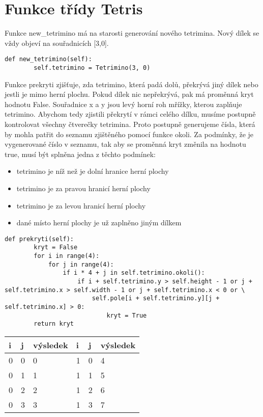 \documentclass[12pt]{report}			%
\begin{document}
			\section{Funkce třídy Tetris}
Funkce new\_tetrimino má na starosti generování nového tetrimina. Nový dílek se vždy objeví na souřadnicích [3,0].
\begin{lstlisting}[title={Program tetris.py}, caption={Vytvoření nového tetrimina}, 							label={lst:tetris.py}]		
    def new_tetrimino(self):
        self.tetrimino = Tetrimino(3, 0)
\end{lstlisting}
Funkce prekryti zjišťuje, zda tetrimino, která padá dolů, překrývá jiný dílek nebo jestli je mimo herní plochu. Pokud dílek nic nepřekrývá, pak má proměnná kryt hodnotu False. 
Souřadnice x a y jsou levý horní roh mřížky, kterou zaplňuje tetrimino. Abychom tedy  zjistili překrytí v rámci celého dílku, musíme postupně kontrolovat všechny čtverečky tetrimina. Proto postupně generujeme čísla, která by mohla patřit do seznamu zjištěného pomocí funkce okoli. Za podmínky, že je vygenerované číslo v seznamu, tak aby se proměnná kryt změnila na hodnotu true, musí být splněna jedna z těchto podmínek:
\begin{itemize}
\item tetrimino je níž než je dolní hranice herní plochy
\item tetrimino je za pravou hranicí herní plochy
\item tetrimino je za levou hranicí herní plochy
\item dané místo herní plochy je už zaplněno jiným dílkem 
\end{itemize}
\begin{lstlisting}[title={Program tetris.py}, caption={Funkce překrytí}, 							label={lst:tetris.py}]		
    def prekryti(self):
        kryt = False
        for i in range(4):
            for j in range(4):
                if i * 4 + j in self.tetrimino.okoli():
                    if i + self.tetrimino.y > self.height - 1 or j + self.tetrimino.x > self.width - 1 or j + self.tetrimino.x < 0 or \
                        self.pole[i + self.tetrimino.y][j + self.tetrimino.x] > 0:
                            kryt = True
        return kryt
\end{lstlisting}
\begin{table}[ht]
\centering
\begin{tabular}{|p{2cm}|p{2cm}|p{2cm}||p{2cm}|p{2cm}|p{2cm}|}
  \hline
  {i} & {j} & {výsledek} & {i} & {j} & {výsledek}\\
  \hline 
  0 & 0 & 0 & 1 & 0 & 4\\
  \hline 
  0 & 1 & 1 & 1 & 1 & 5\\
  \hline 
  0 & 2 & 2 & 1 & 2 & 6\\
  \hline 
  0 & 3 & 3 & 1 & 3 & 7\\
  \hline 
\end{tabular}
\end{table}
\end{document}
